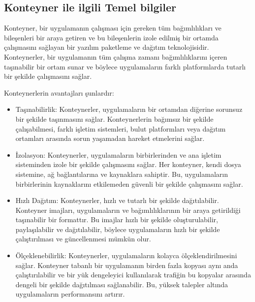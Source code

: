 \subsection{Konteyner ile ilgili Temel bilgiler}
Konteyner, bir uygulamanın çalışması için gereken tüm bağımlılıkları ve bileşenleri bir araya getiren ve bu bileşenlerin izole edilmiş bir ortamda çalışmasını sağlayan bir yazılım paketleme ve dağıtım teknolojisidir. Konteynerler, bir uygulamanın tüm çalışma zamanı bağımlılıklarını içeren taşınabilir bir ortam sunar ve böylece uygulamaların farklı platformlarda tutarlı bir şekilde çalışmasını sağlar.

Konteynerlerin avantajları şunlardır:
\begin{itemize}
  \item Taşınabilirlik: Konteynerler, uygulamaların bir ortamdan diğerine sorunsuz bir şekilde taşınmasını sağlar. Konteynerlerin bağımsız bir şekilde çalışabilmesi, farklı işletim sistemleri, bulut platformları veya dağıtım ortamları arasında sorun yaşamadan hareket etmelerini sağlar.
  \item İzolasyon: Konteynerler, uygulamaların birbirlerinden ve ana işletim sisteminden izole bir şekilde çalışmasını sağlar. Her konteyner, kendi dosya sistemine, ağ bağlantılarına ve kaynaklara sahiptir. Bu, uygulamaların birbirlerinin kaynaklarını etkilemeden güvenli bir şekilde çalışmasını sağlar.
  \item Hızlı Dağıtım: Konteynerler, hızlı ve tutarlı bir şekilde dağıtılabilir. Konteyner imajları, uygulamaların ve bağımlılıklarının bir araya getirildiği taşınabilir bir formattır. Bu imajlar hızlı bir şekilde oluşturulabilir, paylaşılabilir ve dağıtılabilir, böylece uygulamaların hızlı bir şekilde çalıştırılması ve güncellenmesi mümkün olur.
  \item Ölçeklenebilirlik: Konteynerler, uygulamaların kolayca ölçeklendirilmesini sağlar. Konteyner tabanlı bir uygulamanın birden fazla kopyası aynı anda çalıştırılabilir ve bir yük dengeleyici kullanılarak trafiğin bu kopyalar arasında dengeli bir şekilde dağıtılması sağlanabilir. Bu, yüksek talepler altında uygulamaların performansını artırır.
\end{itemize}

